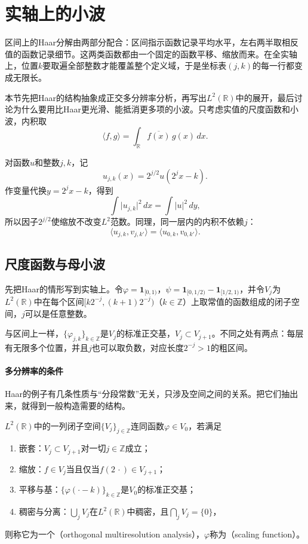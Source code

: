 \section{实轴上的小波}
\label{sec:wavelet-real-line}

区间上的Haar分解由两部分配合：区间指示函数记录平均水平，左右两半取相反值的函数记录细节。这两类函数都由一个固定的函数平移、缩放而来。在全实轴上，位置$k$要取遍全部整数才能覆盖整个定义域，于是坐标表$(j,k)$的每一行都变成无限长。

本节先把Haar的结构抽象成正交多分辨率分析，再写出$L^2(\mathbb R)$中的展开，最后讨论为什么要用比Haar更光滑、能抵消更多项的小波。只考虑实值的尺度函数和小波，内积取
\[
 \langle f,g\rangle=\int_{\mathbb R}\overline{f(x)}\,g(x)\,dx.
\]

对函数$u$和整数$j,k$，记
\begin{equation}
 u_{j,k}(x)=2^{j/2}u(2^jx-k).
 \label{eq:wavelet-dilate-translate}
\end{equation}
作变量代换$y=2^jx-k$，得到
\[
 \int\lvert u_{j,k}\rvert^2\,dx=\int\lvert u\rvert^2\,dy,
\]
所以因子$2^{j/2}$使缩放不改变$L^2$范数。同理，同一层内的内积不依赖$j$：
\[
 \langle u_{j,k},v_{j,k'}\rangle=\langle u_{0,k},v_{0,k'}\rangle.
\]

\subsection{尺度函数与母小波}
\label{sec:wavelet-scaling-mother}

先把Haar的情形写到实轴上。令$\varphi=\mathbf{1}_{[0,1)}$，$\psi=\mathbf{1}_{[0,1/2)}-\mathbf{1}_{[1/2,1)}$，并令$V_j$为$L^2(\mathbb R)$中在每个区间$[k2^{-j},(k+1)2^{-j})$（$k\in\mathbb Z$）上取常值的函数组成的闭子空间，$j$可以是任意整数。

与区间上一样，$\{\varphi_{j,k}\}_{k\in\mathbb Z}$是$V_j$的标准正交基，$V_j\subset V_{j+1}$。不同之处有两点：每层有无限多个位置，并且$j$也可以取负数，对应长度$2^{-j}>1$的粗区间。

\paragraph{多分辨率的条件}
Haar的例子有几条性质与“分段常数”无关，只涉及空间之间的关系。把它们抽出来，就得到一般构造需要的结构。

\begin{definition}[正交多分辨率分析]
\label{def:wavelet-mra}
$L^2(\mathbb R)$中的一列闭子空间$\{V_j\}_{j\in\mathbb Z}$连同函数$\varphi\in V_0$，若满足
\begin{enumerate}
\item 嵌套：$V_j\subset V_{j+1}$对一切$j\in\mathbb Z$成立；
\item 缩放：$f\in V_j$当且仅当$f(2\,\cdot)\in V_{j+1}$；
\item 平移与基：$\{\varphi(\cdot-k)\}_{k\in\mathbb Z}$是$V_0$的标准正交基；
\item 稠密与分离：$\bigcup_jV_j$在$L^2(\mathbb R)$中稠密，且$\bigcap_jV_j=\{0\}$，
\end{enumerate}
则称它为一个（orthogonal multiresolution analysis），$\varphi$称为（scaling function）。
\end{definition}

